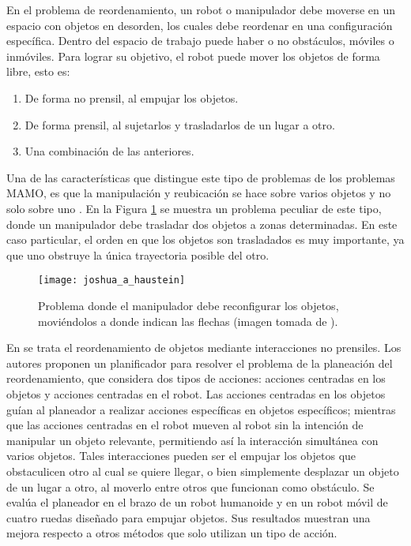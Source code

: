 En el problema de reordenamiento, un robot o manipulador debe moverse en un espacio con objetos en desorden, los cuales debe reordenar en una configuración específica.
Dentro del espacio de trabajo puede haber o no obstáculos, móviles o inmóviles.
Para lograr su objetivo, el robot puede mover los objetos de forma libre, esto es:
%
\begin{enumerate}[label=\alph*)]
	\item De forma no prensil, al empujar los objetos.
	\item De forma prensil, al sujetarlos y trasladarlos de un lugar a otro.
	\item Una combinación de las anteriores.
\end{enumerate}
%
Una de las características que distingue este tipo de problemas de los problemas MAMO, es que la manipulación y reubicación se hace sobre varios objetos y no solo sobre uno \cite{2019arXiv190103557H}.
En la Figura \ref{fig:2019arXiv190103557H} se muestra un problema peculiar de este tipo, donde un manipulador debe trasladar dos objetos a zonas determinadas.
En este caso particular, el orden en que los objetos son trasladados es muy importante, ya que uno obstruye la única trayectoria posible del otro.
%
\begin{figure}[H]
	\texttt{[image: joshua\_a\_haustein]}%
	\caption{Problema donde el manipulador debe reconfigurar los objetos, moviéndolos a donde indican las flechas (imagen tomada de \cite{2019arXiv190103557H}).}%
	\label{fig:2019arXiv190103557H}%
\end{figure}
%
En \cite{7487583} se trata el reordenamiento de objetos mediante interacciones no prensiles.
Los autores proponen un planificador para resolver el problema de la planeación del reordenamiento, que considera dos tipos de acciones: acciones centradas en los objetos y acciones centradas en el robot.
Las acciones centradas en los objetos guían al planeador a realizar acciones específicas en objetos específicos; mientras que las acciones centradas en el robot mueven al robot sin la intención de manipular un objeto relevante, permitiendo así la interacción simultánea con varios objetos.
Tales interacciones pueden ser el empujar los objetos que obstaculicen otro al cual se quiere llegar, o bien simplemente desplazar un objeto de un lugar a otro, al moverlo entre otros que funcionan como obstáculo.
Se evalúa el planeador en el brazo de un robot humanoide y en un robot móvil de cuatro ruedas diseñado para empujar objetos.
Sus resultados muestran una mejora respecto a otros métodos que solo utilizan un tipo de acción.

